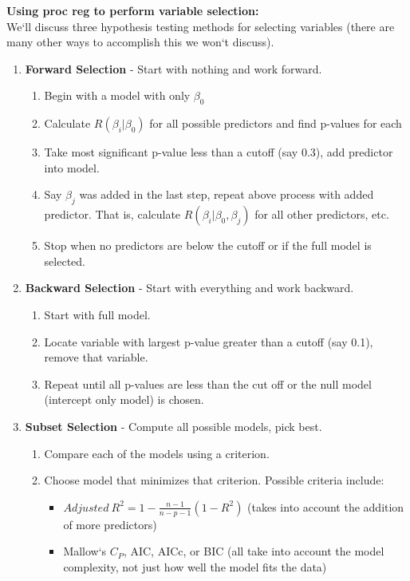 \newpage

\textbf{Using proc reg to perform variable selection:}\\
We`ll discuss three hypothesis testing methods for selecting variables (there are many other ways to accomplish this we won`t discuss).
\begin{enumerate}
\item \textbf{Forward Selection} - Start with nothing and work forward.
	\begin{enumerate}
		\item Begin with a model with only $\beta_0$
		\item Calculate $R(\beta_i|\beta_0)$ for all possible predictors and find p-values for each
		\item Take most significant p-value less than a cutoff (say 0.3), add predictor into model.  
		\item Say $\beta_j$ was added in the last step, repeat above process with added predictor.  That is, calculate $R(\beta_i|\beta_0,\beta_j)$ for all other predictors, etc.
		\item Stop when no predictors are below the cutoff or if the full model is selected.
	\end{enumerate}
\item \textbf{Backward Selection} - Start with everything and work backward. 
\begin{enumerate}
		\item Start with full model.
		\item Locate variable with largest p-value greater than a cutoff (say 0.1), remove that variable.
		\item Repeat until all p-values are less than the cut off or the null model (intercept only model) is chosen.
	\end{enumerate}
\item \textbf{Subset Selection} - Compute all possible models, pick best.
\begin{enumerate}
		\item Compare each of the models using a criterion.
		\item Choose model that minimizes that criterion.  Possible criteria include:
		\begin{itemize}
			\item $Adjusted~R^2 = 1-\frac{n-1}{n-p-1}(1-R^2)$ (takes into account the addition of more predictors)
			\item Mallow`s $C_P$, AIC, AICc, or BIC (all take into account the model complexity, not just how well the model fits the data)
		\end{itemize}
	\end{enumerate}
\end{enumerate}

